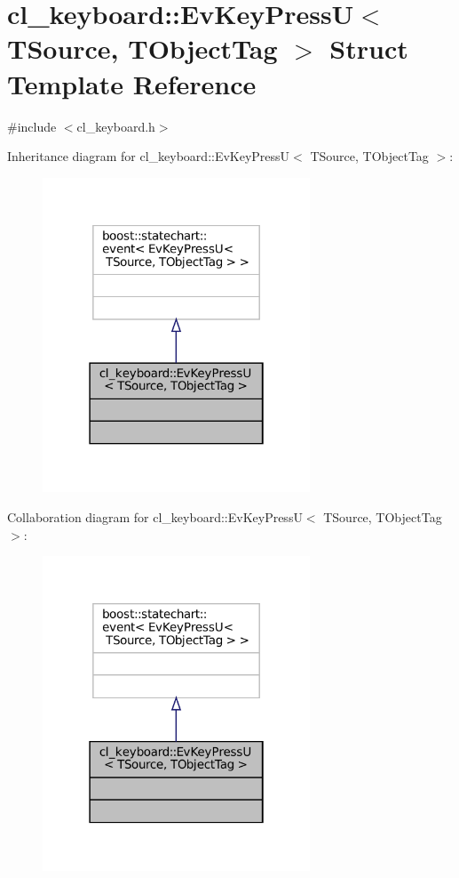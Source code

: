 \hypertarget{structcl__keyboard_1_1EvKeyPressU}{}\section{cl\+\_\+keyboard\+:\+:Ev\+Key\+PressU$<$ T\+Source, T\+Object\+Tag $>$ Struct Template Reference}
\label{structcl__keyboard_1_1EvKeyPressU}


{\ttfamily \#include $<$cl\+\_\+keyboard.\+h$>$}



Inheritance diagram for cl\+\_\+keyboard\+:\+:Ev\+Key\+PressU$<$ T\+Source, T\+Object\+Tag $>$\+:
\nopagebreak
\begin{figure}[H]
\begin{center}
\leavevmode
\includegraphics[width=226pt]{structcl__keyboard_1_1EvKeyPressU__inherit__graph}
\end{center}
\end{figure}


Collaboration diagram for cl\+\_\+keyboard\+:\+:Ev\+Key\+PressU$<$ T\+Source, T\+Object\+Tag $>$\+:
\nopagebreak
\begin{figure}[H]
\begin{center}
\leavevmode
\includegraphics[width=226pt]{structcl__keyboard_1_1EvKeyPressU__coll__graph}
\end{center}
\end{figure}


